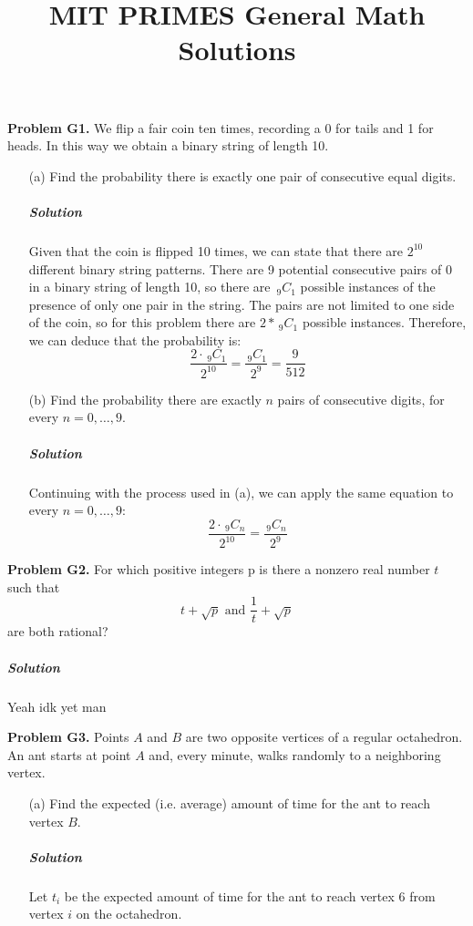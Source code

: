 \documentclass[a4paper]{amsart}
\title{MIT PRIMES General Math Solutions}
\newcommand{\nCr}[2]{\,_{#1}C_{#2}} %
\begin{document}
	\maketitle
	\begin{flushleft}
		\textbf{Problem G1.} We flip a fair coin ten times, recording a 0 for tails and 1 for heads. In this way we obtain a binary string of length 10.
		
		\begin{enumerate}
			\item[(a)] Find the probability there is exactly one pair of consecutive equal digits.
			
			\subparagraph{\textit{Solution}} Given that the coin is flipped 10 times, we can state that there are $2^{10}$ different binary string patterns. There are 9 potential consecutive pairs of 0 in a binary string of length 10, so there are $\nCr{9}{1}$ possible instances of the presence of only one pair in the string. The pairs are not limited to one side of the coin, so for this problem there are $2*\nCr{9}{1}$ possible instances. Therefore, we can deduce that the probability is:
			\[ \frac{2\cdot\nCr{9}{1}}{2^{10}}=\frac{\nCr{9}{1}}{2^{9}}=\frac{9}{512} \]
			
			\item[(b)] Find the probability there are exactly $n$ pairs of consecutive digits, for every $n=0,\dotsc,9$.
			
			\subparagraph{\textit{Solution}} Continuing with the process used in (a), we can apply the same equation to every $n=0,\dotsc,9$:
			\[ \frac{2\cdot\nCr{9}{n}}{2^{10}}=\frac{\nCr{9}{n}}{2^{9}} \]
		\end{enumerate}
		
		\textbf{Problem G2.} For which positive integers p is there a nonzero real number $t$ such that \[ t+\sqrt{p}  \text{ and } \frac{1}{t}+\sqrt{p}\] are both rational?
		
		\subparagraph{\textit{Solution}} Yeah idk yet man
		
		\textbf{Problem G3.} Points $A$ and $B$ are two opposite vertices of a regular octahedron. An ant starts at point $A$ and, every minute, walks randomly to a neighboring vertex.
		
		\begin{enumerate}
			\item[(a)] Find the expected (i.e. average) amount of time for the ant to reach vertex $B$.
			
			\subparagraph{\textit{Solution}} Let $t_i$ be the expected amount of time for the ant to reach vertex 6 from vertex $i$ on the octahedron.
			

\end{enumerate}
\end{flushleft}
\end{document}

